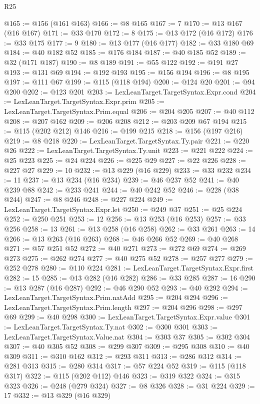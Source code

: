 \begin{lexlean}{R25}
\begin{coremodule}
@165 := @156 (@161 @163)
@166 := @8 @165
@167 := 7
@170 := @13 @167 (@16 @167)
@171 := @33 @170
@172 := 8
@175 := @13 @172 (@16 @172)
@176 := @33 @175
@177 := 9
@180 := @13 @177 (@16 @177)
@182 := @33 @180 @69
@184 := @40 @182 @52
@185 := @176 @184
@187 := @40 @185 @52
@189 := @32 (@171 @187)
@190 := @8 @189
@191 := @55 @122
@192 := @191 @27
@193 := @131 @69
@194 := @192 @193
@195 := @156 @194
@196 := @8 @195
@197 := @111 @67
@199 := @115 (@118 @194)
@200 := @124 @20
@201 := @94 @200
@202 := @123 @201
@203 := LexLeanTarget.TargetSyntax.Expr.cond
@204 := LexLeanTarget.TargetSyntax.Expr.prim
@205 := LexLeanTarget.TargetSyntax.Prim.equal
@206 := @204 @205
@207 := @40 @112
@208 := @207 @162
@209 := @206 @208
@212 := @203 @209 @67 @194
@215 := @115 (@202 @212) @146
@216 := @199 @215
@218 := @156 (@197 @216)
@219 := @8 @218
@220 := LexLeanTarget.TargetSyntax.Ty.pair
@221 := @220 @26
@222 := LexLeanTarget.TargetSyntax.Ty.unit
@223 := @221 @222
@224 := @25 @223
@225 := @24 @224
@226 := @225 @29
@227 := @22 @226
@228 := @227 @27
@229 := 10
@232 := @13 @229 (@16 @229)
@233 := @33 @232
@234 := 11
@237 := @13 @234 (@16 @234)
@239 := @46 @237 @52
@241 := @40 @239 @88
@242 := @233 @241
@244 := @40 @242 @52
@246 := @228 (@38 @244)
@247 := @8 @246
@248 := @227 @224
@249 := LexLeanTarget.TargetSyntax.Expr.let
@250 := @249 @37
@251 := @25 @224
@252 := @250 @251
@253 := 12
@256 := @13 @253 (@16 @253)
@257 := @33 @256
@258 := 13
@261 := @13 @258 (@16 @258)
@262 := @33 @261
@263 := 14
@266 := @13 @263 (@16 @263)
@268 := @46 @266 @52
@269 := @40 @268
@271 := @57 @251 @52
@272 := @40 @271
@273 := @272 @69
@274 := @269 @273
@275 := @262 @274
@277 := @40 @275 @52
@278 := @257 @277
@279 := @252 @278
@280 := @110 @224
@281 := LexLeanTarget.TargetSyntax.Expr.first
@282 := 15
@285 := @13 @282 (@16 @282)
@286 := @33 @285
@287 := 16
@290 := @13 @287 (@16 @287)
@292 := @46 @290 @52
@293 := @40 @292
@294 := LexLeanTarget.TargetSyntax.Prim.natAdd
@295 := @204 @294
@296 := LexLeanTarget.TargetSyntax.Prim.length
@297 := @204 @296
@298 := @297 @69
@299 := @40 @298
@300 := LexLeanTarget.TargetSyntax.Expr.value
@301 := LexLeanTarget.TargetSyntax.Ty.nat
@302 := @300 @301
@303 := LexLeanTarget.TargetSyntax.Value.nat
@304 := @303 @37
@305 := @302 @304
@307 := @40 @305 @52
@308 := @299 @307
@309 := @295 @308
@310 := @40 @309
@311 := @310 @162
@312 := @293 @311
@313 := @286 @312
@314 := @281 @313
@315 := @280 @314
@317 := @57 @224 @52
@319 := @115 (@118 @317)
@322 := @115 (@202 @112) @146
@323 := @319 @322
@324 := @315 @323
@326 := @248 (@279 @324)
@327 := @8 @326
@328 := @31 @224
@329 := 17
@332 := @13 @329 (@16 @329)

\end{coremodule}
\end{lexlean}
